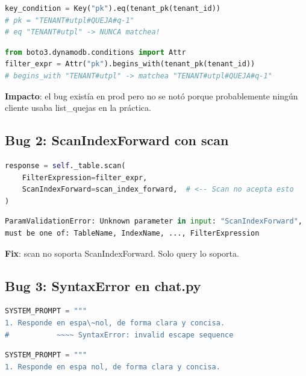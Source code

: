 \documentclass[11pt,a4paper,oneside]{article}
\begin{document}
\begin{lstlisting}[language=Python,caption={ANTES (BUG)}]
key_condition = Key("pk").eq(tenant_pk(tenant_id))
# pk = "TENANT#utpl#QUEJA#q-1"
# eq "TENANT#utpl" -> NUNCA matchea!
\end{lstlisting}

\begin{lstlisting}[language=Python,caption={DESPU\'ES (FIX)}]
from boto3.dynamodb.conditions import Attr
filter_expr = Attr("pk").begins_with(tenant_pk(tenant_id))
# begins_with "TENANT#utpl" -> matchea "TENANT#utpl#QUEJA#q-1"
\end{lstlisting}

\textbf{Impacto}: el bug exist\'ia en prod pero no se not\'o porque probablemente
ning\'un cliente usaba list\_quejas en la pr\'actica.

\subsection{Bug 2: ScanIndexForward con scan}

\begin{lstlisting}[language=Python,caption={ANTES (BUG)}]
response = self._table.scan(
    FilterExpression=filter_expr,
    ScanIndexForward=scan_index_forward,  # <-- Scan no acepta esto
)
\end{lstlisting}

\begin{lstlisting}[language=Python,caption={Error}]
ParamValidationError: Unknown parameter in input: "ScanIndexForward",
must be one of: TableName, IndexName, ..., FilterExpression
\end{lstlisting}

\textbf{Fix}: scan no soporta ScanIndexForward. Solo query lo soporta.

\subsection{Bug 3: SyntaxError en chat.py}

\begin{lstlisting}[language=Python,caption={ANTES (BUG)}]
SYSTEM_PROMPT = """
1. Responde en espa\~nol, de forma clara y concisa.
#           ~~~~ SyntaxError: invalid escape sequence
\end{lstlisting}

\begin{lstlisting}[language=Python,caption={DESPU\'ES (FIX)}]
SYSTEM_PROMPT = """
1. Responde en espa nol, de forma clara y concisa.
\end{lstlisting}
\end{document}
